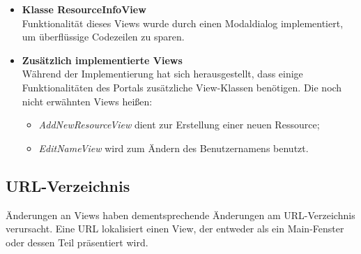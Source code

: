\documentclass[parskip=full,11pt]{scrartcl}
\begin{document}
\begin{itemize}
\item \textbf{Klasse ResourceInfoView}\\
Funktionalität dieses Views wurde durch einen Modaldialog implementiert, um überflüssige Codezeilen zu sparen.
\newpage
\item \textbf{Zusätzlich implementierte Views}\\
Während der Implementierung hat sich herausgestellt, dass einige Funktionalitäten des Portals zusätzliche View-Klassen benötigen. Die noch nicht erwähnten Views heißen:
\begin{itemize}
\item \textit{AddNewResourceView} dient zur Erstellung einer neuen Ressource;
\item \textit{EditNameView} wird zum Ändern des Benutzernamens benutzt.
\end{itemize} 
\end{itemize}

\subsection{URL-Verzeichnis}
Änderungen an Views haben dementsprechende Änderungen am URL-Verzeichnis verursacht. Eine URL lokalisiert einen View, der entweder als ein Main-Fenster oder dessen Teil präsentiert wird.  \\
\renewcommand{\labelitemi}{$\bullet$}
\renewcommand{\labelitemii}{$\bullet$}
\renewcommand{\labelitemiii}{$\bullet$} 
 
\end{document}
